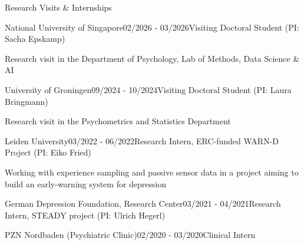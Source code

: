 \documentclass{resume} %
\begin{document}
\begin{rSection}{Research Visits \& Internships}


\begin{rSubsection}{National University of Singapore}{02/2026 - 03/2026}{Visiting Doctoral Student (PI: Sacha Epskamp)}
\item
\item[] Research visit in the Department of Psychology, Lab of Methods, Data Science \& AI
\end{rSubsection}    

\begin{rSubsection}{University of Groningen}{09/2024 - 10/2024}{Visiting Doctoral Student (PI: Laura Bringmann)}
\item
\item[] Research visit in the Psychometrics and Statistics Department
\end{rSubsection}

\begin{rSubsection}{Leiden University}{03/2022 - 06/2022}{Research Intern, ERC-funded WARN-D Project (PI: Eiko Fried)}
\item
\item[] Working with experience sampling and passive sensor data in a project aiming to build an early-warning system for depression
\end{rSubsection}

\begin{rSubsection}{German Depression Foundation, Research Center}{03/2021 - 04/2021}{Research Intern, STEADY project (PI: Ulrich Hegerl)} 

\end{rSubsection}



\begin{rSubsection}{PZN Nordbaden (Psychiatric Clinic)}{02/2020 - 03/2020}{Clinical Intern}

\end{rSubsection}




\end{rSection}
\end{document}
